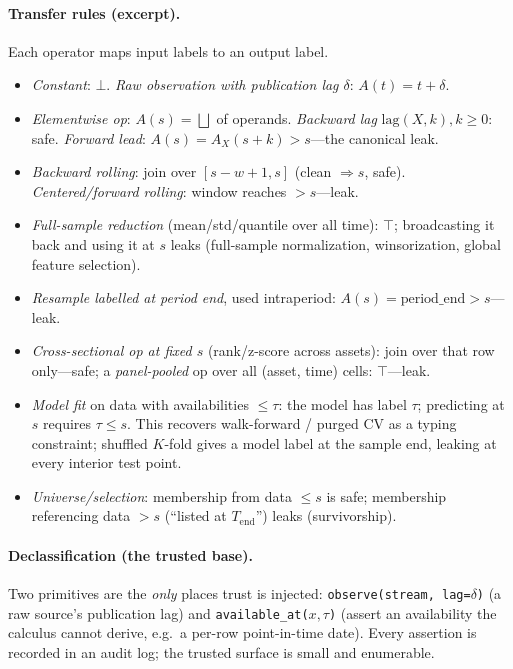 \documentclass[11pt]{article}
\theoremstyle{plain}
\theoremstyle{definition}
\begin{document}
\paragraph{Transfer rules (excerpt).}
Each operator maps input labels to an output label.
\begin{itemize}\itemsep1pt
  \item \emph{Constant}: $\bot$. \emph{Raw observation with publication lag
    $\delta$}: $A(t)=t+\delta$.
  \item \emph{Elementwise op}: $A(s)=\bigsqcup$ of operands. \emph{Backward lag}
    $\mathrm{lag}(X,k),k\ge 0$: safe. \emph{Forward lead}: $A(s)=A_X(s+k)>s$---the
    canonical leak.
  \item \emph{Backward rolling}: join over $[s-w+1,s]$ (clean $\Rightarrow s$,
    safe). \emph{Centered/forward rolling}: window reaches $>s$---leak.
  \item \emph{Full-sample reduction} (mean/std/quantile over all time): $\top$;
    broadcasting it back and using it at $s$ leaks (full-sample normalization,
    winsorization, global feature selection).
  \item \emph{Resample labelled at period end}, used intraperiod:
    $A(s)=\text{period\_end}>s$---leak.
  \item \emph{Cross-sectional op at fixed $s$} (rank/z-score across assets): join
    over that row only---safe; a \emph{panel-pooled} op over all (asset, time)
    cells: $\top$---leak.
  \item \emph{Model fit} on data with availabilities $\le\tau$: the model has
    label $\tau$; predicting at $s$ requires $\tau\le s$. This recovers
    walk-forward / purged CV as a typing constraint; shuffled $K$-fold gives a
    model label at the sample end, leaking at every interior test point.
  \item \emph{Universe/selection}: membership from data $\le s$ is safe;
    membership referencing data $>s$ (``listed at $T_{\text{end}}$'') leaks
    (survivorship).
\end{itemize}

\paragraph{Declassification (the trusted base).}
Two primitives are the \emph{only} places trust is injected:
\texttt{observe(stream, lag=$\delta$)} (a raw source's publication lag) and
\texttt{available\_at($x,\tau$)} (assert an availability the calculus cannot
derive, e.g.\ a per-row point-in-time date). Every assertion is recorded in an
audit log; the trusted surface is small and enumerable.
\end{document}

